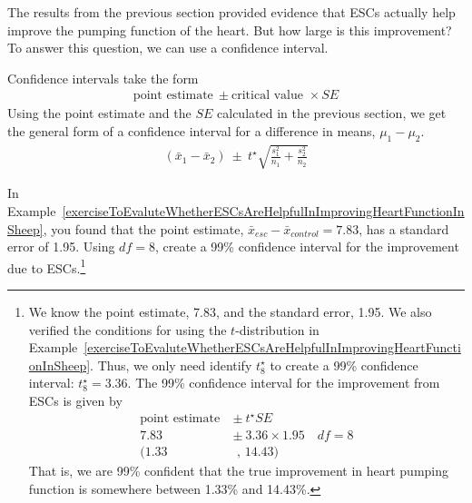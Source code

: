 The results from the previous section provided evidence that ESCs actually help improve the pumping function of the heart. But how large is this improvement? To answer this question, we can use a confidence interval.

Confidence intervals take the form
\begin{align*}
\text{point estimate} \ \pm \text{critical value }\times SE
\end{align*}
Using the point estimate and the $SE$ calculated in the previous section, we get the general form of a confidence interval for a difference in means, $\mu_1-\mu_2$.
\begin{align*}
(\bar{x}_1-\bar{x}_2) \ \pm \ t^{\star}\sqrt{\frac{s_1^2}{n_1} + \frac{s_2^2}{n_2}}
\end{align*}

\begin{exercise}
In Example~\ref{exerciseToEvaluteWhetherESCsAreHelpfulInImprovingHeartFunctionInSheep}, you found that the point estimate, $\bar{x}_{esc} - \bar{x}_{control} = 7.83$, has a standard error of 1.95. Using $df=8$, create a 99\% confidence interval for the improvement due to ESCs.\footnote{We know the point estimate, 7.83, and the standard error, 1.95. We also verified the conditions for using the $t$-distribution in Example~\ref{exerciseToEvaluteWhetherESCsAreHelpfulInImprovingHeartFunctionInSheep}. Thus, we only need identify $t^{\star}_8$ to create a 99\% confidence interval: $t^{\star}_{8} = 3.36$. The 99\% confidence interval for the improvement from ESCs is given by
\begin{align*}
\text{point estimate}\ &\pm\ t^{\star}SE \\
7.83\ &\pm\ 3.36\times 1.95 \quad  df=8\\
(1.33 &\text{ , } 14.43)
\end{align*}
That is, we are 99\% confident that the true improvement in heart pumping function is somewhere between 1.33\% and 14.43\%.}


\end{exercise}

\textA{\newpage}

